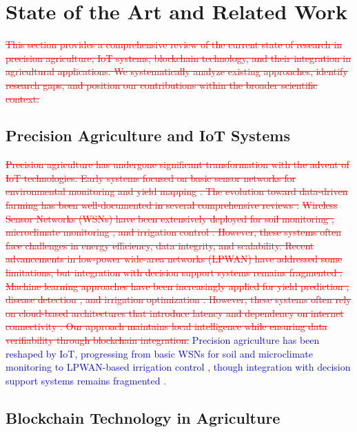 \documentclass[pdflatex,sn-mathphys-num]{sn-jnl}
\theoremstyle{thmstyleone}
\theoremstyle{thmstyletwo}
\theoremstyle{thmstylethree}
\begin{document}
{\section{State of the Art and Related Work}
\label{sec:related_work}

\textcolor{red}{\sout{This section provides a comprehensive review of the current state of research in precision agriculture, IoT systems, blockchain technology, and their integration in agricultural applications. We systematically analyze existing approaches, identify research gaps, and position our contributions within the broader scientific context.}}
\subsection{Precision Agriculture and IoT Systems}
\label{subsec:precision_agriculture}

\textcolor{red}{\sout{Precision agriculture has undergone significant transformation with the advent of IoT technologies. Early systems focused on basic sensor networks for environmental monitoring and yield mapping . The evolution toward data-driven farming has been well-documented in several comprehensive reviews .}}
\textcolor{red}{\sout{Wireless Sensor Networks (WSNs) have been extensively deployed for soil monitoring , microclimate monitoring , and irrigation control . However, these systems often face challenges in energy efficiency, data integrity, and scalability. Recent advancements in low-power wide-area networks (LPWAN) have addressed some limitations, but integration with decision support systems remains fragmented .}}
\textcolor{red}{\sout{Machine learning approaches have been increasingly applied for yield prediction , disease detection , and irrigation optimization . However, these systems often rely on cloud-based architectures that introduce latency and dependency on internet connectivity . Our approach maintains local intelligence while ensuring data verifiability through blockchain integration.}}
\textcolor{blue}{Precision agriculture has been reshaped by IoT, progressing from basic WSNs for soil and microclimate monitoring \cite{wang2006wireless, bogena2010soil, pierce1999site} to LPWAN-based irrigation control \cite{evans2008precision}, though integration with decision support systems remains fragmented \cite{aydin2021comprehensive, zhang2002precision, gebbers2010precision}.}

\subsection{Blockchain Technology in Agriculture}
\label{subsec:blockchain_agriculture}

}
\end{document}
